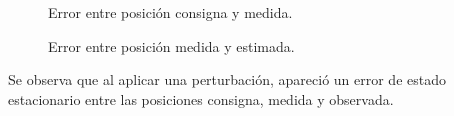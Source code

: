 \documentclass[a4paper, 10pt, onecolumn,journal]{ieeeconf}
\begin{document}
\begin{figure}[H]
	\centering
	\begin{adjustbox}{scale=0.53,max width=\columnwidth}
	\end{adjustbox}
	\caption{Error entre  posición consigna y medida.}
	\label{Error entre  posición consigna y medida}
\end{figure}

\begin{figure}[H]
	\centering
	\begin{adjustbox}{scale=0.53,max width=\columnwidth}
	\end{adjustbox}
	\caption{Error entre  posición medida y estimada.}
	\label{Error entre  posición medida y estimada}
\end{figure}
Se observa que al aplicar una perturbación, apareció un error de estado estacionario entre las posiciones consigna, medida y observada.
\end{document}
